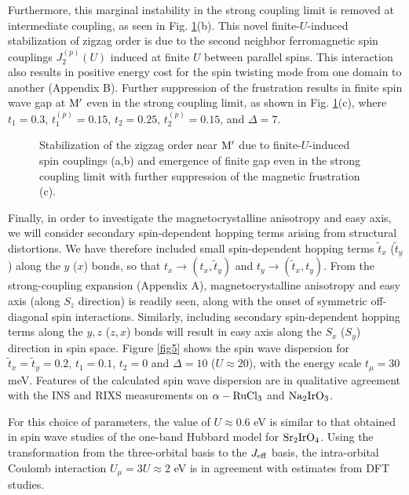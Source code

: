 \documentclass[aps,prb,fleqn,12pt,amsmath,amssymb]{revtex4}
\begin{document}
Furthermore, this marginal instability in the strong coupling limit is removed at intermediate coupling, as seen in Fig. \ref{fig4}(b). This novel finite-$U$-induced stabilization of zigzag order is due to the second neighbor ferromagnetic spin couplings $J_2 ^{(p)}(U)$ induced at finite $U$ between parallel spins. This interaction also results in positive energy cost for the spin twisting mode from one domain to another (Appendix B). Further suppression of the frustration results in finite spin wave gap at ${\rm M'}$  even in the strong coupling limit, as shown in Fig. \ref{fig4}(c), where $t_1 = 0.3$, $t_1 ^{(p)}= 0.15$, $t_2=0.25$, $t_2 ^{(p)}=0.15$, and $\Delta=7$. 

\begin{figure}
\vspace*{0mm}
\hspace*{0mm}
\caption{Stabilization of the zigzag order near ${\rm M'}$ due to finite-$U$-induced spin couplings (a,b) and emergence of finite gap even in the strong coupling limit with further suppression of the magnetic frustration (c).} 
\label{fig4}
\end{figure}

Finally, in order to investigate the magnetocrystalline anisotropy and easy axis, we will consider secondary spin-dependent hopping terms arising from structural distortions. We have therefore included small spin-dependent hopping terms $\tilde{t}_x$ ($\tilde{t}_y$) along the $y$ ($x$) bonds, so that $t_x \rightarrow (t_x, \tilde{t}_y)$ and $t_y \rightarrow (\tilde{t}_x, t_y)$. From the strong-coupling expansion (Appendix A), magnetocrystalline anisotropy and easy axis (along $S_z$ direction) is readily seen, along with the onset of symmetric off-diagonal spin interactions. Similarly, including secondary spin-dependent hopping terms along the $y,z$ ($z,x$) bonds will result in easy axis along the $S_x$ ($S_y$) direction in spin space. Figure \ref{fig5} shows the spin wave dispersion for $\tilde{t}_x = \tilde{t}_y = 0.2$, $t_1 = 0.1$, $t_2 = 0$ and $\Delta = 10$ ($U\approx 20$), with the energy scale $t_\mu=30$ meV. Features of the calculated spin wave dispersion are in qualitative agreement with the INS and RIXS measurements on $\rm \alpha-RuCl_3$ and $\rm Na_2 Ir O_3$.\cite{choi_PRL_2012,gretarsson_PRB_2013,ran_PRL_2017} 

For this choice of parameters, the value of $U \approx 0.6$ eV is similar to that obtained in spin wave studies of the one-band Hubbard model for $\rm Sr_2 Ir O_4$.\cite{iridate_paper} Using the transformation from the three-orbital basis to the $J_{\rm eff}$ basis, the intra-orbital Coulomb interaction $U_\mu = 3U \approx 2$ eV is in agreement with estimates from DFT studies. 
\end{document}
